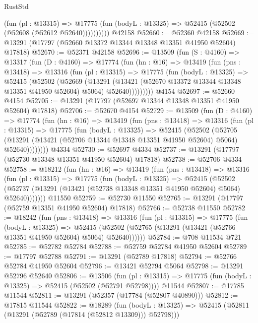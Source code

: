 \begin{lexlean}{RustStd}
\begin{coremodule}
              (fun (pl : @13315) =>
              @17775 (fun (bodyL : @13325) => @52415 (@52502 (@52608 (@52612 @52640))))))))))
    @42158
@52660 := @52360 @42158
@52669 := @13291 (@17797 (@52660 @13372 @13344 @13348 @13351 @41950 @52604) @17818)
@52670 := @52371 @42158
@52696 := @13509
    (fun (S : @4160) =>
    @13317
      (fun (D : @4160) =>
      @17774
        (fun (hn : @16) =>
        @13419
          (fun (pns : @13418) =>
          @13316
            (fun (pl : @13315) =>
            @17775
              (fun (bodyL : @13325) =>
              @52415
                (@52502
                  (@52669
                    (@13291
                      (@13421 (@52670 @13372 @13344 @13348 @13351 @41950 @52604) @5064)
                      @52640)))))))))
    @4154
@52697 := @52660 @4154
@52705 := @13291 (@17797 (@52697 @13344 @13348 @13351 @41950 @52604) @17818)
@52706 := @52670 @4154
@52729 := @13509
    (fun (D : @4160) =>
    @17774
      (fun (hn : @16) =>
      @13419
        (fun (pns : @13418) =>
        @13316
          (fun (pl : @13315) =>
          @17775
            (fun (bodyL : @13325) =>
            @52415
              (@52502
                (@52705
                  (@13291 (@13421 (@52706 @13344 @13348 @13351 @41950 @52604) @5064) @52640))))))))
    @4334
@52730 := @52697 @4334
@52737 := @13291 (@17797 (@52730 @13348 @13351 @41950 @52604) @17818)
@52738 := @52706 @4334
@52758 := @18212
    (fun (hn : @16) =>
    @13419
      (fun (pns : @13418) =>
      @13316
        (fun (pl : @13315) =>
        @17775
          (fun (bodyL : @13325) =>
          @52415
            (@52502
              (@52737 (@13291 (@13421 (@52738 @13348 @13351 @41950 @52604) @5064) @52640)))))))
    @11550
@52759 := @52730 @11550
@52765 := @13291 (@17797 (@52759 @13351 @41950 @52604) @17818)
@52766 := @52738 @11550
@52782 := @18242
    (fun (pns : @13418) =>
    @13316
      (fun (pl : @13315) =>
      @17775
        (fun (bodyL : @13325) =>
        @52415 (@52502 (@52765 (@13291 (@13421 (@52766 @13351 @41950 @52604) @5064) @52640))))))
@52784 := @708 @11534 @721
@52785 := @52782 @52784
@52788 := @52759 @52784 @41950 @52604
@52789 := @17797 @52788
@52791 := @13291 (@52789 @17818)
@52794 := @52766 @52784 @41950 @52604
@52796 := @13421 @52794 @5064
@52798 := @13291 @52796 @52640
@52806 := @13506
    (fun (pl : @13315) => @17775 (fun (bodyL : @13325) => @52415 (@52502 (@52791 @52798))))
    @11544
@52807 := @17785 @11544
@52811 := @13291 (@52357 (@17784 (@52807 @40890)))
@52812 := @17815 @11544
@52822 := @18289
    (fun (bodyL : @13325) => @52415 (@52811 (@13291 (@52789 (@17814 (@52812 @13309))) @52798)))

\end{coremodule}
\end{lexlean}
